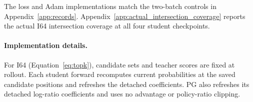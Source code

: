 The loss and Adam implementations match the two-batch controls in Appendix~\ref{app:records}. Appendix~\ref{app:actual_intersection_coverage} reports the actual I64 intersection coverage at all four student checkpoints.

\paragraph{Implementation details.}
For I64 (Equation~\ref{eq:topk}), candidate sets and teacher scores are fixed at rollout. Each student forward recomputes current probabilities at the saved candidate positions and refreshes the detached coefficients. PG also refreshes its detached log-ratio coefficients and uses no advantage or policy-ratio clipping.



